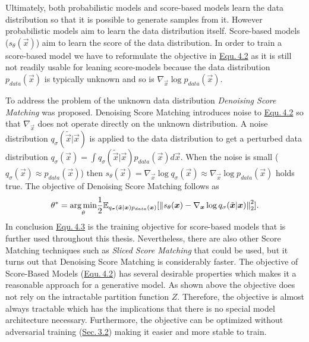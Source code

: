 Ultimately, both probabilistic models and score-based models learn the data distribution so that it is possible to generate samples from it. However probabilistic models aim to learn the data distribution itself. Score-based models ($s_\theta(\vec{x})$) aim to learn the score of the data distribution. In order to train a score-based model we have to reformulate the objective in \hyperref[equ:4.2]{Equ.\,4.2} as it is still not readily usable for leaning score-models because the data distribution $p_{data}(\vec{x})$ is typically unknown and so is $\nabla_{\vec{x}}\log p_{data}(\vec{x})$. 

To address the problem of the unknown data distribution \textit{Denoising Score Matching} \cite{denoise_score} was proposed. Denoising Score Matching introduces noise to \hyperref[equ:4.2]{Equ.\,4.2} so that $\nabla_{\vec{x}}$ does not operate directly on the unknown distribution. A noise distribution $q_\sigma(\tilde{\vec{x}}|\vec{x})$ is applied to the data distribution to get a perturbed data distribution $q_\sigma(\vec{x})=\int q_\sigma(\tilde{\vec{x}}|\vec{x})p_{data}(\vec{x})d\vec{x}$. When the noise is small ($q_\sigma(\vec{x})\approx p_{data}(\vec{x})$) then $s_\theta(\vec{x})=\nabla_{\vec{x}}\log q_\sigma(\vec{x})\approx\nabla_{\vec{x}}\log p_{data}(\vec{x})$ holds true. The objective of Denoising Score Matching follows as
%
\begin{equation} \label{equ:4.3}
    \theta^*=\underset{\theta}{\arg\min}\frac{1}{2}\mathbb{E}_{q_\sigma(\tilde{\boldsymbol{x}}|\boldsymbol{x})p_{data}(\boldsymbol{x})}[\left\lVert s_\theta(\boldsymbol{x})-\nabla_{\boldsymbol{x}}\log q_\sigma(\tilde{\boldsymbol{x}}|\boldsymbol{x})\right\rVert^2_2].
\end{equation}
%
In conclusion \hyperref[equ:4.3]{Equ.\,4.3} is the training objective for score-based models that is further used throughout this thesis. Nevertheless, there are also other Score Matching techniques such as \textit{Sliced Score Matching} \cite{song2019sliced} that could be used, but it turns out that Denoising Score Matching is considerably faster. The objective of Score-Based Models (\hyperref[equ:4.2]{Equ.\,4.2}) has several desirable properties which makes it a reasonable approach for a generative model. As shown above the objective does not rely on the intractable partition function $Z$. Therefore, the objective is almost always tractable which has the implications that there is no special model architecture necessary. Furthermore, the objective can be optimized without adversarial training (\hyperref[sec:gans]{Sec.\,3.2}) making it easier and more stable to train.

